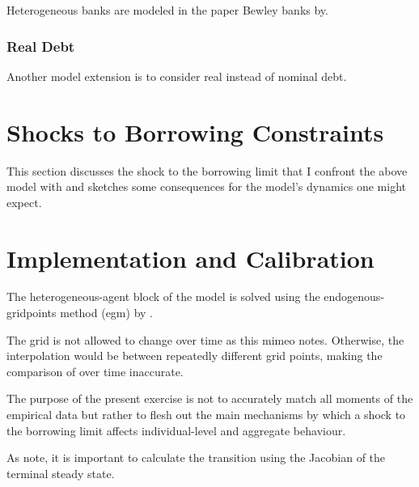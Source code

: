 \documentclass[12pt]{article} %
\numberwithin{equation}{section} %
\begin{document}

Heterogeneous banks are modeled in the paper Bewley banks by.

\subsubsection{Real Debt}
\label{sec:model-extensions-realdebt}

Another model extension is to consider real instead of nominal debt. 

\section{Shocks to Borrowing Constraints}
\label{sec:shocks}

This section discusses the shock to the borrowing limit that I confront the above model with and sketches some consequences for the model's dynamics one might expect.

\section{Implementation and Calibration}
\label{sec:implementation}

The heterogeneous-agent block of the model is solved using the endogenous-gridpoints method (\Gls{egm}) by \textcite{carroll2006}.

The grid is not allowed to change over time as this mimeo notes. Otherwise, the interpolation would be between repeatedly different grid points, making the comparison of over time inaccurate. 

The purpose of the present exercise is not to accurately match all moments of the empirical data but rather to flesh out the main mechanisms by which a shock to the borrowing limit affects individual-level and aggregate behaviour.

As \textcite{auclert2021} note, it is important to calculate the transition using the Jacobian of the terminal steady state.
\end{document}
